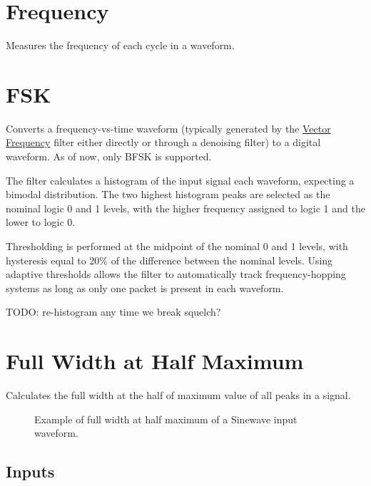 \section{Frequency}

Measures the frequency of each cycle in a waveform.

\pagebreak
\section{FSK}

Converts a frequency-vs-time waveform (typically generated by the \hyperref[filter:vector_frequency]{Vector Frequency}
filter either directly or through a denoising filter) to a digital waveform. As of now, only BFSK is supported.

The filter calculates a histogram of the input signal each waveform, expecting a bimodal distribution. The two highest
histogram peaks are selected as the nominal logic 0 and 1 levels, with the higher frequency assigned to logic 1 and the
lower to logic 0.

Thresholding is performed at the midpoint of the nominal 0 and 1 levels, with hysteresis equal to 20\% of the
difference between the nominal levels. Using adaptive thresholds allows the filter to automatically track
frequency-hopping systems as long as only one packet is present in each waveform.

TODO: re-histogram any time we break squelch?

\pagebreak
\section{Full Width at Half Maximum}
\label{filter:FullWidthHalfMaximum}

Calculates the full width at the half of maximum value of all peaks in a signal.

\begin{figure}[h]
\centering
{}
\caption{Example of full width at half maximum of a Sinewave input waveform. }
\label{filter_cdrpll}
\end{figure}

\subsection{Inputs}

